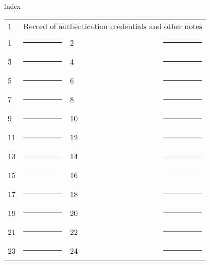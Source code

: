 \newpage

\begin{center}
{\large
Index \vspace{.5in}
}

\begin{tabular}{l l l l }
	1 & \multicolumn{3}{l}{Record of authentication credentials and other notes} \vspace{.225in} \\
	1 & \rule{1.75in}{.2pt} & 2 & \rule{1.75in}{.2pt} \vspace{.225in} \\
	3 & \rule{1.75in}{.2pt} & 4 & \rule{1.75in}{.2pt} \vspace{.225in} \\
	5 & \rule{1.75in}{.2pt} & 6 & \rule{1.75in}{.2pt} \vspace{.225in} \\
	7 & \rule{1.75in}{.2pt} & 8 & \rule{1.75in}{.2pt} \vspace{.225in} \\
	9 & \rule{1.75in}{.2pt} & 10 & \rule{1.75in}{.2pt} \vspace{.225in} \\
	11 & \rule{1.75in}{.2pt} & 12 & \rule{1.75in}{.2pt} \vspace{.225in} \\
	13 & \rule{1.75in}{.2pt} & 14 & \rule{1.75in}{.2pt} \vspace{.225in} \\
	15 & \rule{1.75in}{.2pt} & 16 & \rule{1.75in}{.2pt} \vspace{.225in} \\
	17 & \rule{1.75in}{.2pt} & 18 & \rule{1.75in}{.2pt} \vspace{.225in} \\
	19 & \rule{1.75in}{.2pt} & 20 & \rule{1.75in}{.2pt} \vspace{.225in} \\
	21 & \rule{1.75in}{.2pt} & 22 & \rule{1.75in}{.2pt} \vspace{.225in} \\
	23 & \rule{1.75in}{.2pt} & 24 & \rule{1.75in}{.2pt} \vspace{.225in} \\
\end{tabular}

\end{center}

\newpage

